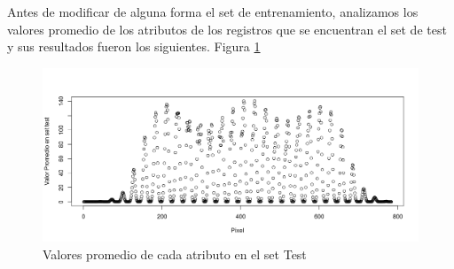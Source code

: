 Antes de modificar de alguna forma el set de entrenamiento, analizamos los valores promedio de los atributos de los registros que se encuentran el set de test y sus resultados fueron los siguientes. Figura \ref{plot2}
\begin{figure}[htp]
  \begin{center}
    \includegraphics[width=15cm]{Rplot01.jpeg}
    \caption{Valores promedio de cada atributo en el set Test}
    \label{plot2}
  \end{center}
\end{figure}
